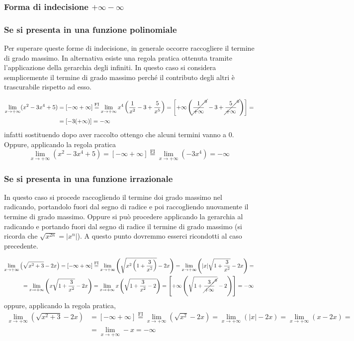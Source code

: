 \documentclass{book}     %
\begin{document}
\subsubsection{Forma di indecisione $+\infty-\infty$}
\subsubsection{Se si presenta in una funzione polinomiale}
Per superare queste forme di indecisione, in generale occorre raccogliere il termine di grado massimo. In alternativa esiste una regola pratica ottenuta tramite l'applicazione della gerarchia degli infiniti. In questo caso si considera semplicemente il termine di grado massimo perché il contributo degli altri è trascurabile rispetto ad esso.
\begin{ex}
\[\begin{aligned}\lim_{x\to +\infty}(x^2-3x^4+5)&=[-\infty+\infty]\overset{\mathrm{FI}}{=}\lim_{x\to +\infty}x^4\left( {\frac{1}{x^2}} -3+\frac{5}{x^5}\right)=\left[ +\infty \left( \cancel{\frac{1}{+\infty}^0}-3+\cancel{\frac{5}{+\infty}^0 }\right) \right]=\\&=[-3(+\infty)]=-\infty\end{aligned}\]
infatti sostituendo dopo aver raccolto ottengo che alcuni termini vanno a 0. Oppure, applicando la regola pratica
\[\lim_{x\to +\infty}(x^2-3x^4+5)=[-\infty+\infty]\overset{\mathrm{FI}}{=}\lim_{x\to +\infty}(-3x^4)=-\infty\]
\end{ex}
\subsubsection{Se si presenta in una funzione irrazionale}
In questo caso si procede raccogliendo il termine doi grado massimo nel radicando, portandolo fuori dal segno di radice e poi raccogliendo nuovamente il termine di grado massimo. Oppure si può procedere applicando la gerarchia al radicando e portando fuori dal segno di radice il termine di grado massimo (si ricorda che $\sqrt{x^{2n}}=|x^n|$). A questo punto dovremmo esserci ricondotti al caso precedente. 
\begin{ex}
\[\begin{aligned}\lim_{x\to +\infty}\left(\sqrt{x^2+3}-2x\right)=[-\infty+\infty]\overset{\mathrm{FI}}{=}\lim_{x\to +\infty}\left(\sqrt{x^2\left( 1+\frac{3}{x^2} \right)}-2x\right)=\lim_{x\to +\infty}\left(|x|\sqrt{1+\frac{3}{x^2}}-2x\right) =\\= \lim_{x\to +\infty}\left(x\sqrt{1+\frac{3}{x^2}}-2x\right) =\lim_{x\to +\infty}x\left( \sqrt{1+\frac{3}{x^2}-2} \right)=\left[ +\infty\left(\sqrt{1+\cancel{\frac{3}{+\infty}^0}} -2\right)\right]=-\infty\end{aligned}\]
oppure, applicando la regola pratica,
\[\begin{aligned}\lim_{x\to +\infty}\left(\sqrt{x^2+3}-2x\right)&=[-\infty+\infty]\overset{\mathrm{FI}}{=}\lim_{x\to +\infty}\left(\sqrt{x^2}-2x\right)=\lim_{x\to +\infty}(|x|-2x) = \lim_{x\to +\infty}(x-2x) = \\&=\lim_{x\to +\infty}-x=-\infty\end{aligned}\]
\end{ex}
\end{document}
